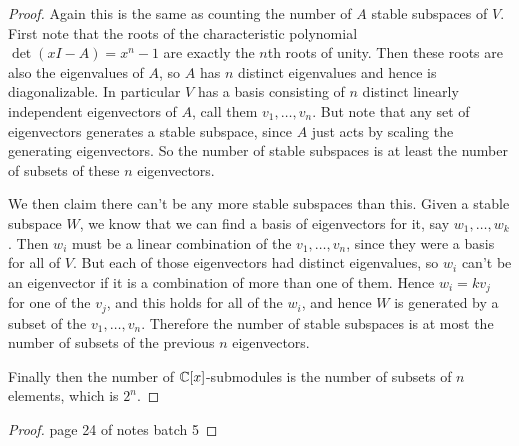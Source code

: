 \documentclass[11pt]{article}
\begin{document}
\begin{proof}
  Again this is the same as counting the number of $A$ stable subspaces of $V$.
  First note that the roots of the characteristic polynomial $\det(xI - A) = x^n - 1$ are exactly the $n$th roots of unity.
  Then these roots are also the eigenvalues of $A$, so $A$ has $n$ distinct eigenvalues and hence is diagonalizable.
  In particular $V$ has a basis consisting of $n$ distinct linearly independent eigenvectors of $A$, call them $v_1,\dots,v_n$.
  But note that any set of eigenvectors generates a stable subspace, since $A$ just acts by scaling the generating eigenvectors.
  So the number of stable subspaces is at least the number of subsets of these $n$ eigenvectors.
  
  We then claim there can't be any more stable subspaces than this.
  Given a stable subspace $W$, we know that we can find a basis of eigenvectors for it, say $w_1,\dots,w_k$.
  Then $w_i$ must be a linear combination of the $v_1,\dots,v_n$, since they were a basis for all of $V$.
  But each of those eigenvectors had distinct eigenvalues, so $w_i$ can't be an eigenvector if it is a combination of more than one of them.
  Hence $w_i = kv_j$ for one of the $v_j$, and this holds for all of the $w_i$, and hence $W$ is generated by a subset of the $v_1,\dots,v_n$.
  Therefore the number of stable subspaces is at most the number of subsets of the previous $n$ eigenvectors.
  
  Finally then the number of $\mathbb{C}[x]$-submodules is the number of subsets of $n$ elements, which is $2^n$.
\end{proof}

\begin{proof}
  page 24 of notes batch 5
\end{proof}

\end{document}
